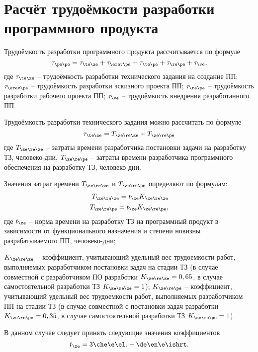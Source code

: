 \section{Расчёт трудоёмкости разработки программного продукта}
Трудоёмкость разработки программного продукта рассчитывается по формуле
\begin{equation*}
	\tau_{\pe\pe} = \tau_{\te\ze} + \tau_{\erev\pe} + \tau_{\te\pe} + \tau_{\re\pe} + \tau_{\ve},
\end{equation*}
где $\tau_{\te\ze}$ -- трудоёмкость разработки технического задания на создание ПП; $\tau_{\erev\pe}$ -- трудоёмкость разработки эскизного проекта ПП; $\tau_{\re\pe}$ -- трудоёмкость разработки рабочего проекта ПП; $\tau_{\ve}$ -- трудоёмкость внедрения разработанного ПП.

Трудоёмкость разработки технического задания можно рассчитать по формуле
\begin{equation*}
	\tau_{\te\ze} = T_{\ze\re\ze} + T_{\ze\re\pe}
\end{equation*}
где $T_{\ze\re\ze}$ -- затраты времени разработчика постановки задачи на разработку ТЗ, человеко-дни, $T_{\ze\re\pe}$ -- затраты времени разработчика программного обеспечения на разработку ТЗ, человеко-дни.

Значения затрат времени $T_{\ze\re\ze}$ и $T_{\ze\re\pe}$ определяют по формулам:
\begin{eqnarray*}
	T_{\ze\re\ze} = t_{\ze} K_{\ze\re\ze} \\
	T_{\ze\re\pe} = t_{\ze} K_{\ze\re\pe},
\end{eqnarray*}
где $t_{\ze}$ -- норма времени на разработку ТЗ на программный продукт в зависимости от функционального назначения и степени новизны разрабатываемого ПП, человеко-дни;

$K_{\ze\re\ze}$ -- коэффициент, учитывающий удельный вес трудоемкости работ, выполняемых разработчиком постановки задач на стадии ТЗ (в случае совместной с разработчиком ПО разработки $K_{\ze\re\ze}=0,65$, в случае самостоятельной разработки ТЗ $K_{\ze\re\ze}=1$); 
$K_{\ze\re\pe}$ -- коэффициент, учитывающий удельный вес трудоемкости работ, выполняемых разработчиком ПП на стадии ТЗ (в случае совместной с постановки задач разработки $K_{\ze\re\pe} = 0,35$, в случае самостоятельной разработки ТЗ $K_{\ze\re\pe} = 1$).

В данном случае следует принять следующие значения коэффициентов
\begin{equation}
	t_{\ze} = 3 \che\e\el.-\de\en\e\ishrt.
\end{equation}

